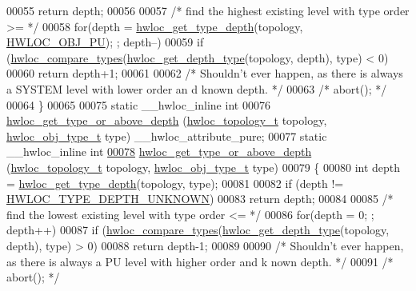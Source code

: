 \begin{DoxyCode}
00055     \textcolor{keywordflow}{return} depth;
00056 
00057   \textcolor{comment}{/* find the highest existing level with type order >= */}
00058   \textcolor{keywordflow}{for}(depth = \hyperlink{a00046_gaea7c64dd59467f5201ba87712710b14d}{hwloc_get_type_depth}(topology, \hyperlink{a00041_ggacd37bb612667dc437d66bfb175a8dc55abca6887e80cb291353b0a0c1da83f661}{HWLOC_OBJ_PU}); ; depth--)
00059     \textcolor{keywordflow}{if} (\hyperlink{a00041_gabd7da4f4ea12b420b8ecbde458b27805}{hwloc_compare_types}(\hyperlink{a00046_gadd4964764ae7e49231065d58a553fd31}{hwloc_get_depth_type}(topology, depth), type) < 0)
00060       \textcolor{keywordflow}{return} depth+1;
00061 
00062   \textcolor{comment}{/* Shouldn't ever happen, as there is always a SYSTEM level with lower order an
      d known depth.  */}
00063   \textcolor{comment}{/* abort(); */}
00064 \}
00065 
00075 \textcolor{keyword}{static} \_\_hwloc\_inline \textcolor{keywordtype}{int}
00076 \hyperlink{a00052_ga62a3f401854c209605c90079700f4bc5}{hwloc_get_type_or_above_depth} (\hyperlink{a00039_ga9d1e76ee15a7dee158b786c30b6a6e38}{hwloc_topology_t} topology, \hyperlink{a00041_gacd37bb612667dc437d66bfb175a8dc55}{hwloc_obj_type_t} type) 
      \_\_hwloc\_attribute\_pure;
00077 \textcolor{keyword}{static} \_\_hwloc\_inline \textcolor{keywordtype}{int}
\hypertarget{a00031_source_l00078}{}\hyperlink{a00052_ga62a3f401854c209605c90079700f4bc5}{00078} \hyperlink{a00052_ga62a3f401854c209605c90079700f4bc5}{hwloc_get_type_or_above_depth} (\hyperlink{a00039_ga9d1e76ee15a7dee158b786c30b6a6e38}{hwloc_topology_t} topology, \hyperlink{a00041_gacd37bb612667dc437d66bfb175a8dc55}{hwloc_obj_type_t} type)
00079 \{
00080   \textcolor{keywordtype}{int} depth = \hyperlink{a00046_gaea7c64dd59467f5201ba87712710b14d}{hwloc_get_type_depth}(topology, type);
00081 
00082   \textcolor{keywordflow}{if} (depth != \hyperlink{a00046_ggaf4e663cf42bbe20756b849c6293ef575a0565ab92ab72cb0cec91e23003294aad}{HWLOC_TYPE_DEPTH_UNKNOWN})
00083     \textcolor{keywordflow}{return} depth;
00084 
00085   \textcolor{comment}{/* find the lowest existing level with type order <= */}
00086   \textcolor{keywordflow}{for}(depth = 0; ; depth++)
00087     \textcolor{keywordflow}{if} (\hyperlink{a00041_gabd7da4f4ea12b420b8ecbde458b27805}{hwloc_compare_types}(\hyperlink{a00046_gadd4964764ae7e49231065d58a553fd31}{hwloc_get_depth_type}(topology, depth), type) > 0)
00088       \textcolor{keywordflow}{return} depth-1;
00089 
00090   \textcolor{comment}{/* Shouldn't ever happen, as there is always a PU level with higher order and k
      nown depth.  */}
00091   \textcolor{comment}{/* abort(); */}

\end{DoxyCode}
